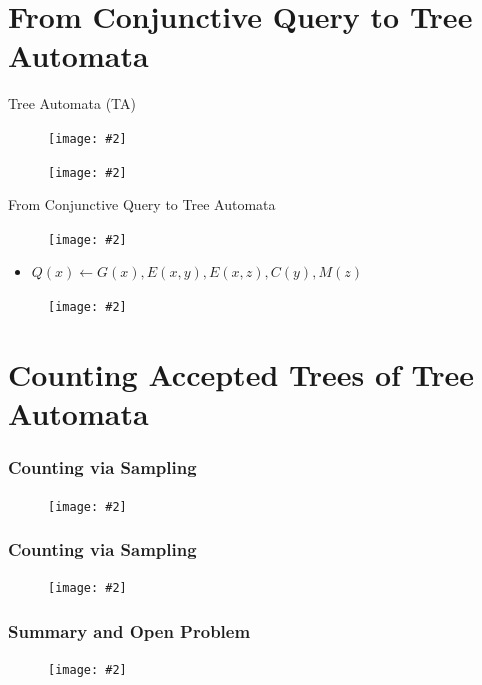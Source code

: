 \documentclass{beamer}
\newcommand{\pic}[2][100]{
	\begin{figure}
		\centering
		\texttt{[image: \#2]}
	\end{figure}
}
\newcommand{\picframe}[3][100]{
	\begin{frame}
		\frametitle{#2}
		\pic[#1]{#3}
	\end{frame}
}
\begin{document}
	\section{From Conjunctive Query to Tree Automata}
	\begin{frame}{Tree Automata (TA)}
		\pic{pics/treeautomata}
		\pic{pics/taexample}			
	\end{frame}
	\begin{frame}{From Conjunctive Query to Tree Automata}
		\pic{pics/cq2ta}
		\vspace{2ex}
		\begin{itemize}
			\item $Q(x)\leftarrow G(x), E(x, y), E(x, z), C(y), M(z)$
		\end{itemize}	
		\vspace{2ex}
		\pic{pics/anstree}		
	\end{frame}
	\section{Counting Accepted Trees of Tree Automata}
	\begin{frame}
		\frametitle{Counting via Sampling}
		\pic{pics/dp}
	\end{frame}
	\picframe{Counting via Sampling}{pics/sample}
	\picframe{Summary and Open Problem}{pics/cfg}
\end{document}
